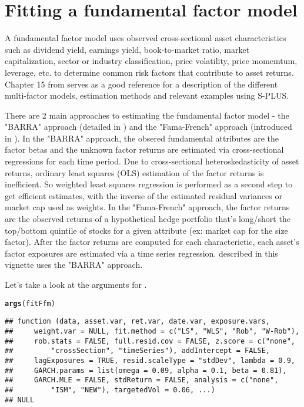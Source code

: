 \documentclass[a4paper]{article}\usepackage[]{graphicx}\usepackage[]{color}
\makeatletter
\newcommand{\hlstd}[1]{\textcolor[rgb]{0.345,0.345,0.345}{#1}}%
\newcommand{\hlkwd}[1]{\textcolor[rgb]{0.737,0.353,0.396}{\textbf{#1}}}%
\newenvironment{kframe}{%
 \def\at@end@of@kframe{}%
 \ifinner\ifhmode%
  \def\at@end@of@kframe{\end{minipage}}%
  \begin{minipage}{\columnwidth}%
 \fi\fi%
 \def\FrameCommand##1{\hskip\@totalleftmargin \hskip-\fboxsep
 \colorbox{shadecolor}{##1}\hskip-\fboxsep
     \hskip-\linewidth \hskip-\@totalleftmargin \hskip\columnwidth}%
 \MakeFramed {\advance\hsize-\width
   \@totalleftmargin\z@ \linewidth\hsize
   \@setminipage}}%
 {\par\unskip\endMakeFramed%
 \at@end@of@kframe}
\newenvironment{knitrout}{}{} %
\makeatother
\begin{document}
\newpage
\section{Fitting a fundamental factor model}

A fundamental factor model uses observed cross-sectional asset characteristics such as dividend yield, earnings yield, book-to-market ratio, market capitalization, sector or industry classification, price volatility, price momemtum, leverage, etc. to determine common risk factors that contribute to asset returns. Chapter 15 from \citet{zivot2006modeling} serves as a good reference for a description of the different multi-factor models, estimation methods and relevant examples using S-PLUS.

There are 2 main approaches to estimating the fundamental factor model - the "BARRA" approach (detailed in \citet{grinold2000active}) and the "Fama-French" approach (introduced in \citet{fama1992cross}). In the "BARRA" approach, the obsered fundamental attributes are the factor betas and the unknown factor returns are estimated via cross-sectional regressions for each time period. Due to cross-sectional heteroskedasticity of asset returns, ordinary least squares (OLS) estimation of the factor returns is inefficient. So weighted least squares regression is performed as a second step to get efficient estimates, with the inverse of the estimated residual variances or market cap used as weights. In the "Fama-French" approach, the factor returns are the observed returns of a hypothetical hedge portfolio that's long/short the top/bottom quintile of stocks for a given attribute (ex: market cap for the size factor). After the factor returns are computed for each characterictic, each asset's factor exposures are estimated via a time series regression.  described in this vignette uses the "BARRA" approach.

Let's take a look at the arguments for .

\begin{knitrout}
\color{fgcolor}\begin{kframe}
\begin{alltt}
\hlkwd{args}\hlstd{(fitFfm)}
\end{alltt}
\begin{verbatim}
## function (data, asset.var, ret.var, date.var, exposure.vars, 
##     weight.var = NULL, fit.method = c("LS", "WLS", "Rob", "W-Rob"), 
##     rob.stats = FALSE, full.resid.cov = FALSE, z.score = c("none", 
##         "crossSection", "timeSeries"), addIntercept = FALSE, 
##     lagExposures = TRUE, resid.scaleType = "stdDev", lambda = 0.9, 
##     GARCH.params = list(omega = 0.09, alpha = 0.1, beta = 0.81), 
##     GARCH.MLE = FALSE, stdReturn = FALSE, analysis = c("none", 
##         "ISM", "NEW"), targetedVol = 0.06, ...) 
## NULL
\end{verbatim}
\end{kframe}
\end{knitrout}
\end{document}
